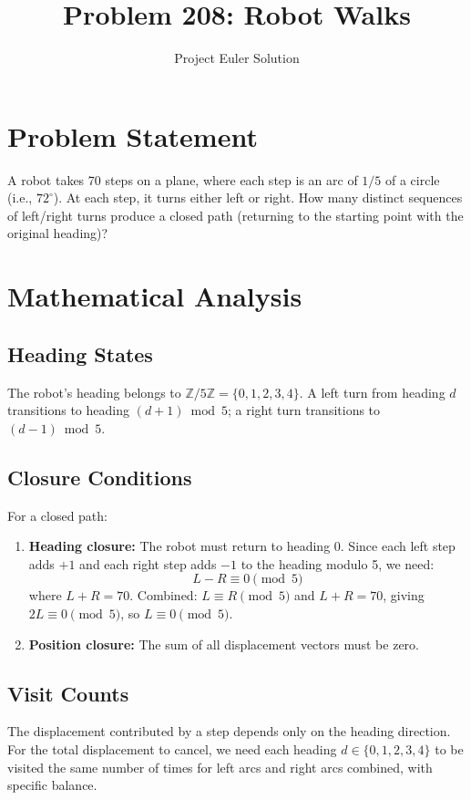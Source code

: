 \documentclass[12pt]{article}
\title{Problem 208: Robot Walks}
\author{Project Euler Solution}
\date{}
\begin{document}
\maketitle

\section{Problem Statement}
A robot takes 70 steps on a plane, where each step is an arc of $1/5$ of a circle (i.e., $72^\circ$). At each step, it turns either left or right. How many distinct sequences of left/right turns produce a closed path (returning to the starting point with the original heading)?

\section{Mathematical Analysis}

\subsection{Heading States}
The robot's heading belongs to $\mathbb{Z}/5\mathbb{Z} = \{0, 1, 2, 3, 4\}$. A left turn from heading $d$ transitions to heading $(d+1) \bmod 5$; a right turn transitions to $(d-1) \bmod 5$.

\subsection{Closure Conditions}
For a closed path:
\begin{enumerate}
    \item \textbf{Heading closure:} The robot must return to heading 0. Since each left step adds $+1$ and each right step adds $-1$ to the heading modulo 5, we need:
    \[
    L - R \equiv 0 \pmod{5}
    \]
    where $L + R = 70$. Combined: $L \equiv R \pmod{5}$ and $L + R = 70$, giving $2L \equiv 0 \pmod 5$, so $L \equiv 0 \pmod 5$.

    \item \textbf{Position closure:} The sum of all displacement vectors must be zero.
\end{enumerate}

\subsection{Visit Counts}
The displacement contributed by a step depends only on the heading direction. For the total displacement to cancel, we need each heading $d \in \{0,1,2,3,4\}$ to be visited the same number of times for left arcs and right arcs combined, with specific balance.
\end{document}

